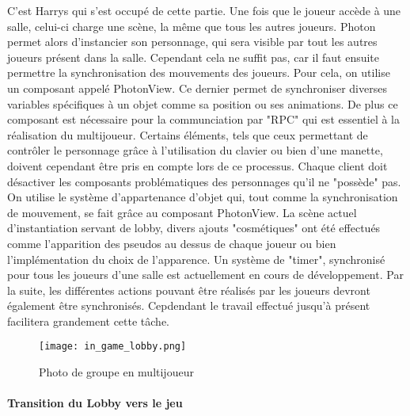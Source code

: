             C'est Harrys qui s'est occupé de cette partie. Une fois que le joueur accède à une salle,
            celui-ci charge une scène, la même que tous les autres joueurs.
            Photon permet alors d'instancier son personnage, qui sera visible par tout les autres joueurs
            présent dans la salle. Cependant cela ne suffit pas, car il faut ensuite permettre la synchronisation
            des mouvements des joueurs. Pour cela, on utilise un composant appelé PhotonView. Ce dernier permet de
            synchroniser diverses variables spécifiques à un objet comme sa position ou ses animations. 
            De plus ce composant est nécessaire pour la communciation par "RPC" qui est essentiel à la réalisation du multijoueur.
            Certains éléments, tels que ceux permettant de contrôler le personnage grâce à l'utilisation du clavier ou bien d'une manette,
            doivent cependant être pris en compte lors de ce processus.
            Chaque client doit désactiver les composants problématiques des personnages qu'il ne "possède" pas.
            On utilise le système
            d'appartenance d'objet qui, tout comme la synchronisation de mouvement, se fait grâce au composant PhotonView.
            La scène actuel d'instantiation servant de lobby, divers ajouts "cosmétiques" ont été effectués comme l'apparition
            des pseudos au dessus de chaque joueur ou bien l'implémentation du choix de l'apparence.
            Un système de "timer", synchronisé pour tous les joueurs d'une salle est actuellement en cours de développement.
            Par la suite, les différentes actions pouvant être réalisés par les joueurs devront également être synchronisés.
            Cepdendant le travail effectué jusqu'à présent facilitera grandement cette tâche.
            
            \begin{figure}[!hbt]
                \centering
                    \texttt{[image: in\_game\_lobby.png]} 
                \caption{Photo de groupe en multijoueur}
            \end{figure}


        \paragraph{Transition du Lobby vers le jeu}
        
